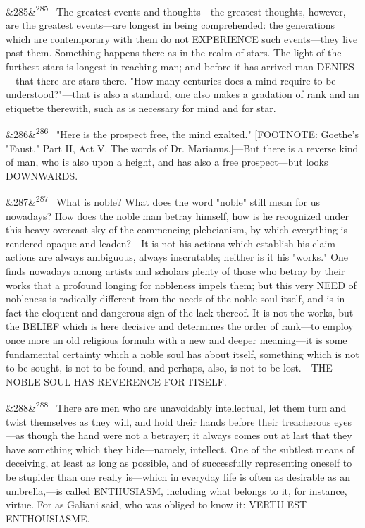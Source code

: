 \documentclass[12pt]{article}
\newcommand{\para}[1][]{\par\noindent\ifx&#1&\else\textsuperscript{\footnotesize #1}~\fi}
\begin{document}
\para[285] The greatest events and thoughts---the greatest thoughts, however, are the greatest events---are longest in being comprehended: the generations which are contemporary with them do not EXPERIENCE such events---they live past them. Something happens there as in the realm of stars. The light of the furthest stars is longest in reaching man; and before it has arrived man DENIES---that there are stars there. "How many centuries does a mind require to be understood?"---that is also a standard, one also makes a gradation of rank and an etiquette therewith, such as is necessary for mind and for star.

\para[286] "Here is the prospect free, the mind exalted." [FOOTNOTE: Goethe's "Faust," Part II, Act V. The words of Dr. Marianus.]---But there is a reverse kind of man, who is also upon a height, and has also a free prospect---but looks DOWNWARDS.

\para[287] What is noble? What does the word "noble" still mean for us nowadays? How does the noble man betray himself, how is he recognized under this heavy overcast sky of the commencing plebeianism, by which everything is rendered opaque and leaden?---It is not his actions which establish his claim---actions are always ambiguous, always inscrutable; neither is it his "works." One finds nowadays among artists and scholars plenty of those who betray by their works that a profound longing for nobleness impels them; but this very NEED of nobleness is radically different from the needs of the noble soul itself, and is in fact the eloquent and dangerous sign of the lack thereof. It is not the works, but the BELIEF which is here decisive and determines the order of rank---to employ once more an old religious formula with a new and deeper meaning---it is some fundamental certainty which a noble soul has about itself, something which is not to be sought, is not to be found, and perhaps, also, is not to be lost.---THE NOBLE SOUL HAS REVERENCE FOR ITSELF.---

\para[288] There are men who are unavoidably intellectual, let them turn and twist themselves as they will, and hold their hands before their treacherous eyes---as though the hand were not a betrayer; it always comes out at last that they have something which they hide---namely, intellect. One of the subtlest means of deceiving, at least as long as possible, and of successfully representing oneself to be stupider than one really is---which in everyday life is often as desirable as an umbrella,---is called ENTHUSIASM, including what belongs to it, for instance, virtue. For as Galiani said, who was obliged to know it: VERTU EST ENTHOUSIASME.
\end{document}
